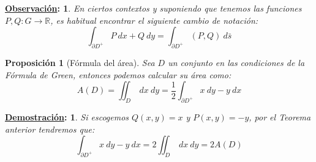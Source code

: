 \documentclass[10pt,a4paper,openright]{book}
\theoremstyle{break}
\newtheorem*{prop}{Proposición}
\newtheorem*{demo}{\underline{Demostración}:}
\newtheorem*{obs}{\underline{Observación}:}
\newcommand{\dif}[1]{\ d#1}
\begin{document}
\begin{obs}
En ciertos contextos y suponiendo que tenemos las funciones $P, Q: G \rightarrow \mathbb{R}$, es habitual encontrar el siguiente cambio de notación:
$$\int_{\partial D^+} P \dif{x} + Q \dif{y} = \int_{\partial D^+} (P, Q) \dif{\bar{s}}$$
\end{obs}

\begin{prop}[Fórmula del área]
Sea $D$ un conjunto en las condiciones de la Fórmula de Green, entonces podemos calcular su área como:
$$A\left(D\right)=\iint_{D} \dif{x} \dif{y} = \frac{1}{2}\int_{\partial D^+} x \dif{y} - y \dif{x}$$
\end{prop}
\begin{demo}
Si escogemos $Q\left( x, y \right) = x$ y $P\left( x, y \right) = -y$, por el Teorema anterior tendremos que:
$$\int_{\partial D^+} x \dif{y} - y \dif{x} = 2\iint_{D} \dif{x} \dif{y} = 2 A\left(D\right)$$
\end{demo}
\end{document}
